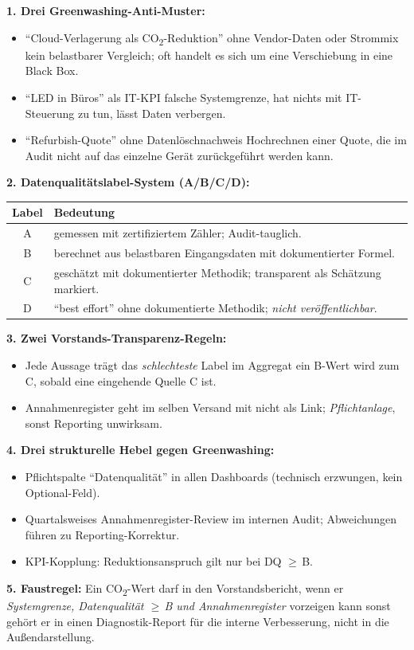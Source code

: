 \documentclass[11pt,a4paper,oneside]{article}
\begin{document}
\begin{loesungbox}
\textbf{1. Drei Greenwashing-Anti-Muster:}
\begin{itemize}
  \item ``Cloud-Verlagerung als CO\textsubscript{2}-Reduktion'' \textendash{} ohne Vendor-Daten oder Strommix kein belastbarer Vergleich; oft handelt es sich um eine Verschiebung in eine Black Box.
  \item ``LED in B\"uros'' als IT-KPI \textendash{} falsche Systemgrenze, hat nichts mit IT-Steuerung zu tun, l\"asst Daten verbergen.
  \item ``Refurbish-Quote'' ohne Datenl\"oschnachweis \textendash{} Hochrechnen einer Quote, die im Audit nicht auf das einzelne Ger\"at zur\"uckgef\"uhrt werden kann.
\end{itemize}

\smallskip
\textbf{2. Datenqualit\"atslabel-System (A/B/C/D):}

\smallskip
\begin{tabularx}{\linewidth}{@{}cX@{}}
\toprule
\textbf{Label} & \textbf{Bedeutung} \\
\midrule
A & gemessen mit zertifiziertem Z\"ahler; Audit-tauglich. \\
B & berechnet aus belastbaren Eingangsdaten mit dokumentierter Formel. \\
C & gesch\"atzt mit dokumentierter Methodik; transparent als Sch\"atzung markiert. \\
D & ``best effort'' ohne dokumentierte Methodik; \emph{nicht ver\"offentlichbar}. \\
\bottomrule
\end{tabularx}

\smallskip
\textbf{3. Zwei Vorstands-Transparenz-Regeln:}
\begin{itemize}
  \item Jede Aussage tr\"agt das \emph{schlechteste} Label im Aggregat \textendash{} ein B-Wert wird zum C, sobald eine eingehende Quelle C ist.
  \item Annahmenregister geht im selben Versand mit \textendash{} nicht als Link; \emph{Pflichtanlage}, sonst Reporting unwirksam.
\end{itemize}

\smallskip
\textbf{4. Drei strukturelle Hebel gegen Greenwashing:}
\begin{itemize}
  \item Pflichtspalte ``Datenqualit\"at'' in allen Dashboards (technisch erzwungen, kein Optional-Feld).
  \item Quartalsweises Annahmenregister-Review im internen Audit; Abweichungen f\"uhren zu Reporting-Korrektur.
  \item KPI-Kopplung: Reduktionsanspruch gilt nur bei DQ $\geq$\,B.
\end{itemize}

\smallskip
\textbf{5. Faustregel:} Ein CO\textsubscript{2}-Wert darf in den Vorstandsbericht, wenn er \emph{Systemgrenze, Datenqualit\"at $\geq$\,B und Annahmenregister} vorzeigen kann \textendash{} sonst geh\"ort er in einen Diagnostik-Report f\"ur die interne Verbesserung, nicht in die Au{\ss}endarstellung.
\end{loesungbox}
\end{document}
